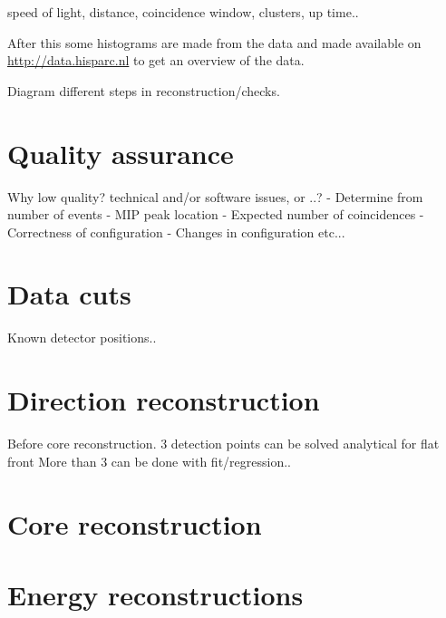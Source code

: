speed of light, distance, coincidence window, clusters, up time..

After this some histograms are made from the data and made available on
\url{http://data.hisparc.nl} to get an overview of the data.

Diagram different steps in reconstruction/checks.


\section{Quality assurance}


Why low quality? technical and/or software issues, or ..?
- Determine from number of events
- MIP peak location
- Expected number of coincidences
- Correctness of configuration
- Changes in configuration
etc...


\section{Data cuts}

Known detector positions..


\section{Direction reconstruction}

Before core reconstruction.
3 detection points can be solved analytical for flat front
More than 3 can be done with fit/regression..


\section{Core reconstruction}




\section{Energy reconstructions}

